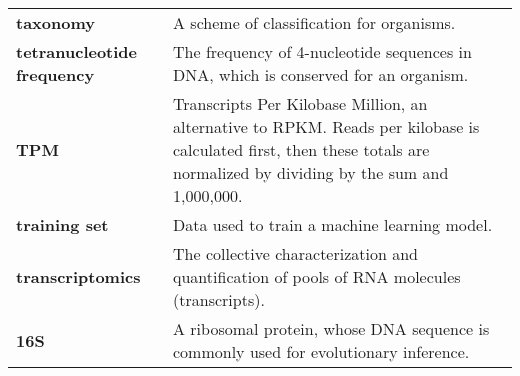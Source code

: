 \begin{singlespace}
\begin{longtable}{ p{}  p{} }
\textbf{taxonomy} & A scheme of classification for organisms. \\
\textbf{tetranucleotide frequency} & The frequency of 4-nucleotide sequences in DNA, which is conserved for an organism. \\
\textbf{TPM} & %
	Transcripts Per Kilobase Million, an alternative to RPKM.
	Reads per kilobase is calculated first, then these totals are normalized by dividing by the sum and 1,000,000. \\
\textbf{training set} &  Data used to train a machine learning model. \\
\textbf{transcriptomics} & The collective characterization and quantification of pools of RNA molecules (transcripts). \\
\textbf{16S} & A ribosomal protein, whose DNA sequence is commonly used for evolutionary inference. \\

\end{longtable}
\end{singlespace}
